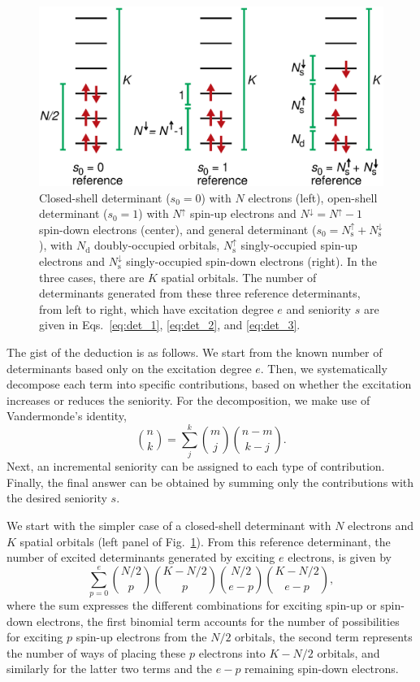 \documentclass[aip,jcp,reprint,noshowkeys,superscriptaddress]{revtex4-1}
\newcommand{\Na}{N^{\uparrow}}
\newcommand{\Nb}{N^{\downarrow}}
\newcommand{\Nd}{N_\text{d}}
\newcommand{\Nas}{N_\text{s}^{\uparrow}}
\newcommand{\Nbs}{N_\text{s}^{\downarrow}}
\begin{document}
\begin{figure}[h!]
\includegraphics[width=1.0\linewidth]{determinants_appendix}
\caption{
Closed-shell determinant ($s_0=0$) with $N$ electrons (left),
open-shell determinant ($s_0=1$) with $\Na$ spin-up electrons and $\Nb=\Na-1$ spin-down electrons (center),
and general determinant ($s_0=\Nas+\Nbs$), with $\Nd$ doubly-occupied orbitals, $\Nas$ singly-occupied spin-up electrons and $\Nbs$ singly-occupied spin-down electrons (right).
In the three cases, there are $K$ spatial orbitals.
The number of determinants generated from these three reference determinants, from left to right, which have excitation degree $e$ and seniority $s$
are given in Eqs.~\eqref{eq:det_1}, \eqref{eq:det_2}, and \eqref{eq:det_3}.
}
\label{fig:appendix}
\end{figure}

The gist of the deduction is as follows.
We start from the known number of determinants based only on the excitation degree $e$.
Then, we systematically decompose each term into specific contributions,
based on whether the excitation increases or reduces the seniority.
For the decomposition, we make use of Vandermonde's identity,
\begin{equation}
	\binom{n}{k} = \sum_{j}^{k} \binom{m}{j} \binom{n-m}{k-j}.
\end{equation}
Next, an incremental seniority can be assigned to each type of contribution.
Finally, the final answer can be obtained by summing only the contributions with the desired seniority $s$.

We start with the simpler case of a closed-shell determinant with $N$ electrons and $K$ spatial orbitals (left panel of Fig.~\ref{fig:appendix}).
From this reference determinant, the number of excited determinants generated by exciting $e$ electrons, is given by \cite{SzaboBook}
\begin{equation}
	\sum_{p=0}^{e} \binom{N/2}{p} \binom{K-N/2}{p} \binom{N/2}{e-p} \binom{K-N/2}{e-p},
\label{eq:e_closed}
\end{equation}
where the sum expresses the different combinations for exciting spin-up or spin-down electrons,
the first binomial term accounts for the number of possibilities for exciting $p$ spin-up electrons from the $N/2$ orbitals,
the second term represents the number of ways of placing these $p$ electrons into $K-N/2$ orbitals,
and similarly for the latter two terms and the $e-p$ remaining spin-down electrons.
\end{document}
